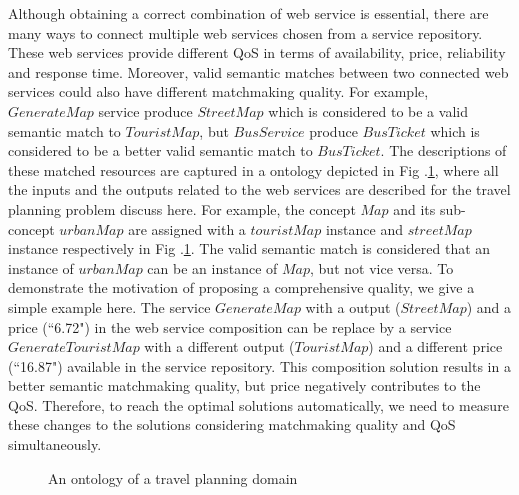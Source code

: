 \documentclass{llncs}
\begin{document}
Although obtaining a correct combination of web service is essential, there are many ways to connect multiple web services chosen from a service repository. These web services provide different QoS in terms of availability, price, reliability and response time. Moreover, valid semantic matches between two connected web services could also have different matchmaking quality. For example, $Generate Map$ service produce $StreetMap$ which is considered to be a valid semantic match to $TouristMap$, but $Bus Service$ produce $BusTicket$ which is considered to be a better valid semantic match to $BusTicket$. The descriptions of these matched resources are captured in a ontology depicted in Fig .\ref{taxonomy}, where all the inputs and the outputs related to the web services are described for the travel planning problem discuss here. For example, the concept $Map$ and its sub-concept $urbanMap$ are assigned with a $touristMap$ instance and $streetMap$ instance respectively in Fig .\ref{taxonomy}. The valid semantic match is considered that an instance of $urban Map$ can be an instance of $Map$, but not vice versa. To demonstrate the motivation of proposing a comprehensive quality, we give a simple example here. The service $GenerateMap$ with a output ($StreetMap$) and a price (``6.72") in the web service composition can be replace by a service $GenerateTouristMap$ with a different output ($TouristMap$) and a different price (``16.87") available in the service repository. This composition solution results in a better semantic matchmaking quality, but price negatively contributes to the QoS. Therefore, to reach the optimal solutions automatically, we need to measure these changes to the solutions considering matchmaking quality and QoS simultaneously. 



\begin{figure}[h]
\centering
{}
 \caption{ An ontology of a travel planning domain}
 \label{taxonomy}
\end{figure}
\end{document}
